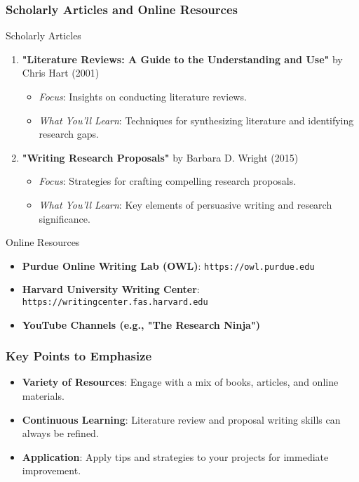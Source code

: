 \documentclass[aspectratio=169]{beamer}
\begin{document}
\begin{frame}[fragile]
    \frametitle{Scholarly Articles and Online Resources}
    \begin{block}{Scholarly Articles}
        \begin{enumerate}
            \item \textbf{"Literature Reviews: A Guide to the Understanding and Use"} by Chris Hart (2001)
                \begin{itemize}
                    \item \textit{Focus}: Insights on conducting literature reviews.
                    \item \textit{What You’ll Learn}: Techniques for synthesizing literature and identifying research gaps.
                \end{itemize}
            \item \textbf{"Writing Research Proposals"} by Barbara D. Wright (2015)
                \begin{itemize}
                    \item \textit{Focus}: Strategies for crafting compelling research proposals.
                    \item \textit{What You’ll Learn}: Key elements of persuasive writing and research significance.
                \end{itemize}
        \end{enumerate}
    \end{block}

    \begin{block}{Online Resources}
        \begin{itemize}
            \item \textbf{Purdue Online Writing Lab (OWL)}: \texttt{https://owl.purdue.edu}
            \item \textbf{Harvard University Writing Center}: \texttt{https://writingcenter.fas.harvard.edu}
            \item \textbf{YouTube Channels (e.g., "The Research Ninja")}
        \end{itemize}
    \end{block}
\end{frame}

\begin{frame}[fragile]
    \frametitle{Key Points to Emphasize}
    \begin{itemize}
        \item \textbf{Variety of Resources}: Engage with a mix of books, articles, and online materials.
        \item \textbf{Continuous Learning}: Literature review and proposal writing skills can always be refined. 
        \item \textbf{Application}: Apply tips and strategies to your projects for immediate improvement.
    \end{itemize}
\end{frame}
\end{document}
